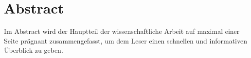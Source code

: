\newpage
\chapter*{Abstract}

Im Abstract wird der Hauptteil der wissenschaftliche Arbeit auf maximal einer Seite prägnant zusammengefasst, um dem Leser einen schnellen und informativen Überblick zu geben.
